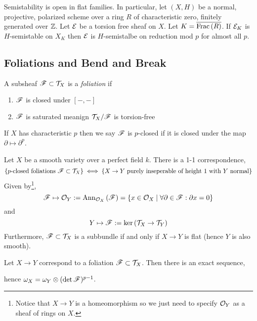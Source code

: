 \documentclass[12pt]{article}
\begin{document}
\begin{theorem}
Semistability is open in flat families. In particular, let $(X, H)$ be a normal, projective, polarized scheme over a ring $R$ of characteristic zero, finitely generated over $\mathbb{Z}$. Let $\mathcal{E}$ be a torsion free sheaf on $X$. Let $K = \overline{\mathrm{Frac}\left(R\right)}$. If $\mathcal{E}_K$ is $H$-semistable on $X_K$ then $\mathcal{E}$ is $H$-semistalbe on reduction mod $p$ for almost all $p$.
\end{theorem}

\subsection{Foliations and Bend and Break}

\begin{defn}
A subsheaf $\mathscr{F} \subset \mathcal{T}_X$ is a \textit{foliation} if
\begin{enumerate}
\item $\mathscr{F}$ is closed under $[-,-]$ 
\item $\mathscr{F}$ is saturated meanign $\mathcal{T}_X / \mathscr{F}$ is torsion-free
\end{enumerate}
If $X$ has characteristic $p$ then we say $\mathscr{F}$ is $p$-closed if it is closed under the map $\partial \mapsto \partial^p$.
\end{defn}

\begin{theorem}[Ekedahl]
Let $X$ be a smooth variety over a perfect field $k$. There is a 1-1 correspondence,
\[ \{ p\text{-closed foliations } \mathscr{F} \subset \mathcal{T}_X \} \iff \{ X \to Y \text{ purely inseperable of height } 1 \text{ with } Y \text{ normal} \} \]
Given by\footnote{Notice that $X \to Y$ is a homeomorphism so we just need to specify $\mathcal{O}_{Y}$ as a sheaf of rings on $X$.},
\[ \mathscr{F} \mapsto \mathcal{O}_{Y} := \mathrm{Ann}_{\mathcal{O}_{X}}\left(\mathscr{F}\right) = \{ x \in \mathcal{O}_{X} \mid \forall \partial \in \mathscr{F} : \partial x = 0 \} \]
and 
\[ Y \mapsto \mathscr{F} := \ker{(\mathcal{T}_X \to \mathcal{T}_Y)} \]
Furthermore, $\mathscr{F} \subset \mathcal{T}_X$ is a subbundle if and only if $X \to Y$ is flat (hence $Y$ is also smooth). 
\end{theorem}

\begin{lemma}
Let $X \to Y$ correspond to a foliation $\mathscr{F} \subset \mathcal{T}_X$. Then there is an exact sequence,
\begin{center}
\end{center}
hence $\omega_X = \omega_Y \otimes (\det{\mathscr{F}})^{p-1}$.
\end{lemma}
\end{document}
